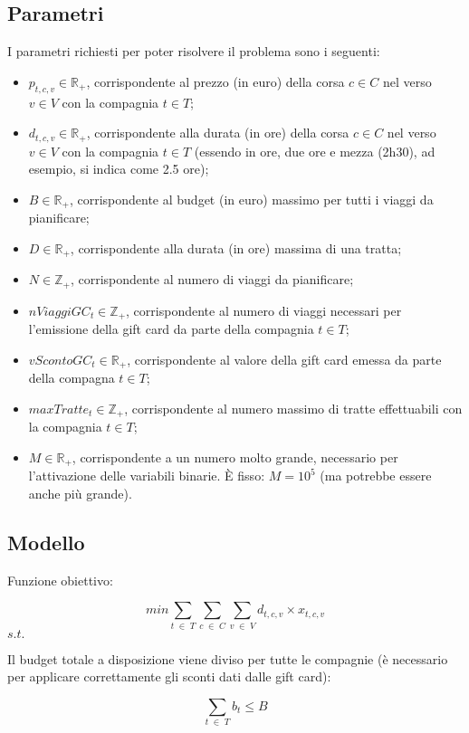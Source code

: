 \documentclass[main.tex]{subfiles}
\begin{document}
\subsection*{Parametri}
I parametri richiesti per poter risolvere il problema sono i seguenti:
\begin{itemize}
    \item $p_{t,c,v} \in \mathbb{R}_+$, corrispondente al prezzo (in euro) della corsa $c \in C$ nel verso $v \in V$ con la compagnia $t \in T$;
    \item $d_{t,c,v} \in \mathbb{R}_+$, corrispondente alla durata (in ore) della corsa $c \in C$ nel verso $v \in V$ con la compagnia $t \in T$ (essendo in ore, due ore e mezza (2h30), ad esempio, si indica come 2.5 ore);
    \item $B \in \mathbb{R}_+$, corrispondente al budget (in euro) massimo per tutti i viaggi da pianificare;
    \item $D \in \mathbb{R}_+$, corrispondente alla durata (in ore) massima di una tratta;
    \item $N \in \mathbb{Z}_+$, corrispondente al numero di viaggi da pianificare;
    \item $nViaggiGC_t \in \mathbb{Z}_+$, corrispondente al numero di viaggi necessari per l'emissione della gift card da parte della compagnia $t \in T$;
    \item $vScontoGC_t \in \mathbb{R}_+$, corrispondente al valore della gift card emessa da parte della compagna $t \in T$;
    \item $maxTratte_t \in \mathbb{Z}_+$, corrispondente al numero massimo di tratte effettuabili con la compagnia $t \in T$;
    \item $M \in \mathbb{R}_+$, corrispondente a un numero molto grande, necessario per l'attivazione delle variabili binarie.
    È fisso: $M = 10^5$ (ma potrebbe essere anche più grande).
\end{itemize}

\subsection*{Modello}
\setlength{\parindent}{0em}
Funzione obiettivo:
\begin{tcolorbox}
$$min \sum_{t\; \in\; T} \sum_{c\; \in\; C} \sum_{v\; \in\; V} d_{t,c,v} \times{} x_{t,c,v}$$
$s.t.$
\end{tcolorbox}

Il budget totale a disposizione viene diviso per tutte le compagnie (è necessario per applicare correttamente gli sconti dati dalle gift card):
\begin{tcolorbox}
$$\sum_{t\; \in\; T} b_t \leq B$$
\end{tcolorbox}
\end{document}
